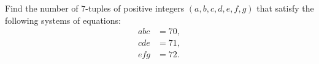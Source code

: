 Find the number of $7$-tuples of positive integers $(a,b,c,d,e,f,g)$ that satisfy the following systems of equations:
\begin{align*}
abc&=70,\\
cde&=71,\\
efg&=72.
\end{align*}